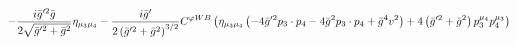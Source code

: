 %
\begin{dmath*}
%
  -  \frac{i {\bar g}^{\prime 2} {\bar g}{}}{2 \sqrt{{\bar g}^{\prime 2} + {\bar g}{}^2}}\eta_{\mu_3 \mu_4}  -  \frac{i {\bar g}^\prime}{2 \left({\bar g}^{\prime 2} + {\bar g}{}^2\right)^{3/2}}C^{ \varphi  WB} \left(\eta_{\mu_3 \mu_4} \left( - 4 {\bar g}^{\prime 2} p_{3}\nobreak\cdot\nobreak{}p_{4} - 4 {\bar g}{}^2 p_{3}\nobreak\cdot\nobreak{}p_{4} + {\bar g}{}^4 v^2\right) + 4 \left({\bar g}^{\prime 2} + {\bar g}{}^2\right) p_3^{\mu_4} p_4^{\mu_3}\right)
%
\end{dmath*}
%
